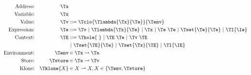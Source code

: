 \begin{figure}[h]
\begin{align*}
\textrm{Address:}     && \Ta          & \\
\textrm{Variable:}    && \Tx          & \\
\textrm{Value:}       && \Tv          & ::= \Tclo{\Tlambda{\Tx}{\Te}}{\Tenv}\\
\textrm{Expression:}  && \Te          & ::=  \Tv
                                        \ |\ \Tlambda{\Tx}{\Te}
                                        \ |\ \Tx
                                        \ |\ \Te\ \Te
                                        \ |\ \Tset{\Te}{\Te}
                                        \ |\ \TI{\Ie}\\
\textrm{Context:}     && \TE          & ::=  \Thole{\ }
                                        \ |\ \TE\ \Te
                                        \ |\ \Tv\ \TE\\&&&
                                        \ |\ \Tset{\TE}{\Te}
                                        \ |\ \Tset{\Tx}{\TE}
                                        \ |\ \TI{\IE}\\
\textrm{Environment:} && \Tenv        & \in \Tx \rightharpoonup \Ta \\
\textrm{Store:}       && \Tstore      & \in \Ta \rightharpoonup \Tv \\
\textrm{Klone:}       && \Tklone{X}   & \in X \rightharpoonup X, X \in \{\Tenv, \Tstore \} \\
\end{align*}
\end{figure}
